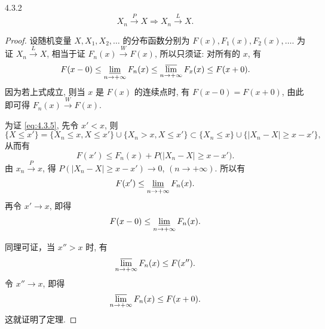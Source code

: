 \begin{theorem}{}{4.3.2}
    \begin{equation*}
        X_n \stackrel{P}{\to} X \Rightarrow X_n \stackrel{L}{\to} X.
    \end{equation*}
\end{theorem}

\begin{proof}
    设随机变量 $ X, X_1,  X_2, \dotsc $  的分布函数分别为 $ F (x), F_1 (x), F_2 (x), \dotsc $.
    为证 $ X_n \stackrel{L}{\to} X $, 相当于证 $ F_n (x) \stackrel{W}{\to} F (x) $, 所以只须证: 对所有的 $ x $, 有
    \begin{equation}\label{eq:4.3.5}
        F ( x - 0 ) \leq \varliminf_{n \to +\infty} F_n (x) \leq \varlimsup_{n \to +\infty} F_x (x) \leq F ( x + 0 ).
    \end{equation}
    因为若上式成立, 则当 $ x $ 是 $ F (x) $ 的连续点时, 有 $ F (x-0) =F (x+0) $, 由此即可得 $ F_n (x) \stackrel{W}{\to} F (x) $.
    
    为证 \eqref{eq:4.3.5}, 先令 $ x' < x $, 则
    \begin{equation*}
        \{ X \leq x' \} = \{ X_n \leq x, X \leq x' \} \cup \{ X_n > x, X \leq x' \} \subset \{ X_n \leq x \} \cup \{ \bigl\lvert X_n - X \bigr\rvert \geq x - x' \},
    \end{equation*}
    从而有
    \begin{equation*}
        F (x') \leq F_n (x) + P \bigl( \bigl\lvert X_n - X \bigr\rvert \geq x - x' \bigr).
    \end{equation*}
    由 $ x_n \stackrel{P}{\to} x $, 得 $ P ( \lvert X_n - X \rvert \geq x - x' ) \to 0 $, $ (n \to +\infty) $.
    所以有
    \begin{equation*}
        F (x') \leq \varliminf_{n \to +\infty} F_n (x).
    \end{equation*}
    再令 $ x' \to x $, 即得
    \begin{equation*}
        F (x-0) \leq \varliminf_{n \to +\infty} F_n (x).
    \end{equation*}
    
    同理可证，当 $ x'' > x $ 时, 有
    \begin{equation*}
        \varlimsup_{n \to +\infty} F_n (x) \leq F (x'').
    \end{equation*}
    令 $ x'' \to x $, 即得
    \begin{equation*}
        \varlimsup_{n \to +\infty} F_n (x) \leq F (x + 0).
    \end{equation*}
    这就证明了定理.
\end{proof}

